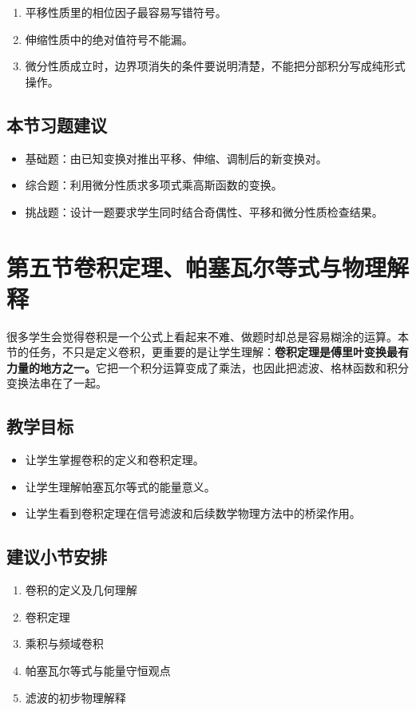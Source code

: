\begin{jinshi}[本节易错点]
\begin{enumerate}
    \item 平移性质里的相位因子最容易写错符号。
    \item 伸缩性质中的绝对值符号不能漏。
    \item 微分性质成立时，边界项消失的条件要说明清楚，不能把分部积分写成纯形式操作。
\end{enumerate}
\end{jinshi}

\subsection*{本节习题建议}
\begin{itemize}
    \item 基础题：由已知变换对推出平移、伸缩、调制后的新变换对。
    \item 综合题：利用微分性质求多项式乘高斯函数的变换。
    \item 挑战题：设计一题要求学生同时结合奇偶性、平移和微分性质检查结果。
\end{itemize}

\section{第五节\quad 卷积定理、帕塞瓦尔等式与物理解释}

\begin{wulibj}[本节要解决的问题]
很多学生会觉得卷积是一个公式上看起来不难、做题时却总是容易糊涂的运算。本节的任务，不只是定义卷积，更重要的是让学生理解：\textbf{卷积定理是傅里叶变换最有力量的地方之一。}它把一个积分运算变成了乘法，也因此把滤波、格林函数和积分变换法串在了一起。
\end{wulibj}

\subsection*{教学目标}
\begin{itemize}
    \item 让学生掌握卷积的定义和卷积定理。
    \item 让学生理解帕塞瓦尔等式的能量意义。
    \item 让学生看到卷积定理在信号滤波和后续数学物理方法中的桥梁作用。
\end{itemize}

\subsection*{建议小节安排}
\begin{enumerate}
    \item 卷积的定义及几何理解
    \item 卷积定理
    \item 乘积与频域卷积
    \item 帕塞瓦尔等式与能量守恒观点
    \item 滤波的初步物理解释
\end{enumerate}

